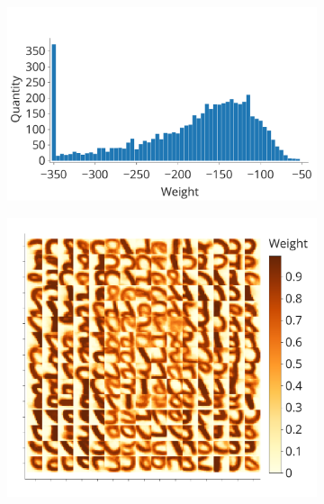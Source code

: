 \documentclass[a4paper,10pt]{article}
\begin{document}
\begin{figure}
\begin{subfigure}{0.45\textwidth}
    \includegraphics[width=\textwidth,keepaspectratio=true]{competition_distribution_clamp_high.pdf}
    \caption{}
    \label{fig:compe_clamp:high_distr}
\end{subfigure}
\begin{subfigure}{0.45\textwidth} 
    \includegraphics[width=\textwidth,keepaspectratio=true]{weights_XY_clamp_high.pdf}
    \caption{}
    \label{fig:compe_clamp:high_weights}
\end{subfigure}

\end{figure}
\end{document}
